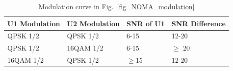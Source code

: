 \begin{table}[t]
\caption{Modulation curve in Fig.~\ref{fig_NOMA_modulation}}
    \begin{tabular}{| l | l | l | l |}
    \hline
    U1 Modulation & U2 Modulation & SNR of U1 & SNR Difference \\ \hline
    QPSK 1/2       & QPSK 1/2       & 6-15           & 12-20                  \\ \hline
    QPSK 1/2       & 16QAM 1/2     & 6-15           &  $\geq$ 20                     \\ \hline
    16QAM 1/2     & QPSK 1/2       & $\geq$15            & 12-20                   \\ \hline
    \end{tabular}
\label{tb_NOMA_modulation}
\end{table}


